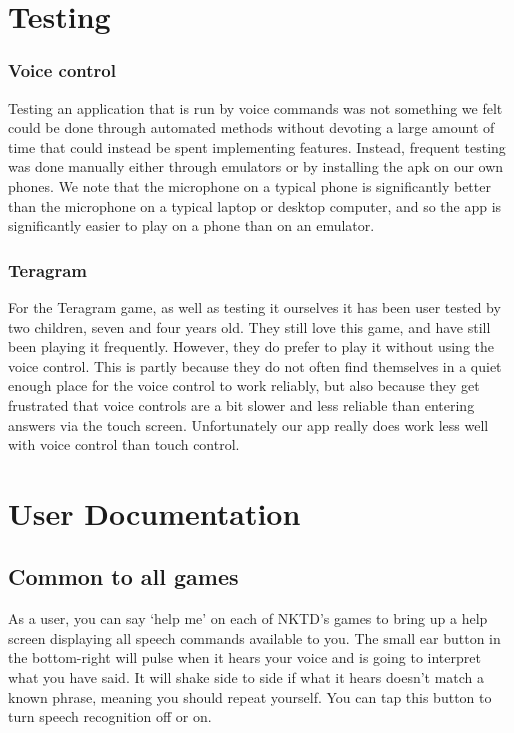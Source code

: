\documentclass[11pt, oneside]{article}
\begin{document}
\section{Testing}

\subsubsection*{Voice control}

Testing an application that is run by voice commands was not something
we felt could be done through automated methods without devoting a
large amount of time that could instead be spent implementing
features. Instead, frequent testing was done manually either through
emulators or by installing the apk on our own phones. We note that the
microphone on a typical phone is significantly better than the
microphone on a typical laptop or desktop computer, and so the app is
significantly easier to play on a phone than on an emulator.

\subsubsection*{Teragram}

For the Teragram game, as well as testing it ourselves it has been
user tested by two children, seven and four years old. They still love
this game, and have still been playing it frequently.  However, they
do prefer to play it without using the voice control. This is partly
because they do not often find themselves in a quiet enough place for
the voice control to work reliably, but also because they get
frustrated that voice controls are a bit slower and less reliable than
entering answers via the touch screen. Unfortunately our app really
does work less well with voice control than touch control.

\pagebreak

\section{User Documentation}

\subsection{Common to all games}

As a user, you can say `help me' on each of NKTD's games to bring up a
help screen displaying all speech commands available to you.
The small ear button in the bottom-right will pulse when it hears your voice 
and is going to interpret what you have said. It will shake side to side if
what it hears doesn't match a known phrase, meaning you should repeat
yourself. You can tap this button to turn speech recognition off or on.
\end{document}
